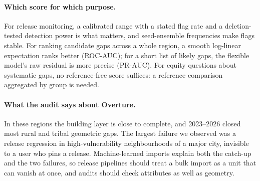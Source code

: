 \documentclass[11pt]{article}
\begin{document}
\paragraph{Which score for which purpose.} For release monitoring, a calibrated range with a stated flag rate and a deletion-tested detection power is what matters, and seed-ensemble frequencies make flags stable. For ranking candidate gaps across a whole region, a smooth log-linear expectation ranks better (ROC-AUC); for a short list of likely gaps, the flexible model's raw residual is more precise (PR-AUC). For equity questions about systematic gaps, no reference-free score suffices: a reference comparison aggregated by group is needed.

\paragraph{What the audit says about Overture.} In these regions the building layer is close to complete, and 2023--2026 closed most rural and tribal geometric gaps. The largest failure we observed was a release regression in high-vulnerability neighbourhoods of a major city, invisible to a user who pins a release. Machine-learned imports explain both the catch-up and the two failures, so release pipelines should treat a bulk import as a unit that can vanish at once, and audits should check attributes as well as geometry.
\end{document}
